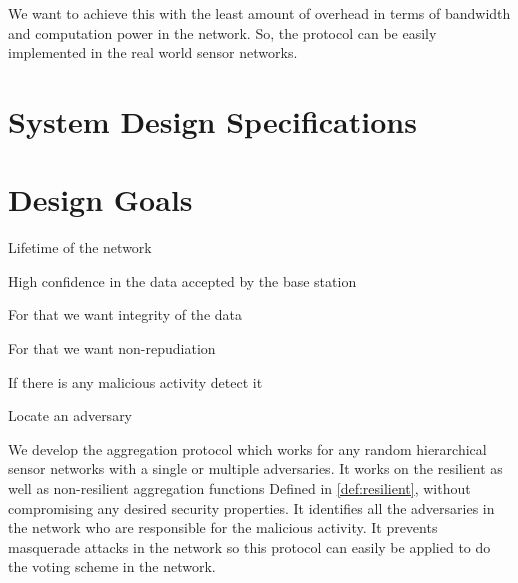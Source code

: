 	We want to achieve this with the least amount of overhead in terms of bandwidth and computation power in the network.
	So, the protocol can be easily implemented in the real world sensor networks.
	

\section{System Design Specifications}

\section{Design Goals}
	Lifetime of the network

	High confidence in the data accepted by the base station

	For that we want integrity of the data

	For that we want non-repudiation

	If there is any malicious activity detect it

	Locate an adversary


	We develop the aggregation protocol which works for any random hierarchical sensor networks with a single or multiple adversaries.
	It works on the resilient as well as non-resilient aggregation functions Defined in \ref{def:resilient}, without compromising any desired security properties.
	It identifies all the adversaries in the network who are responsible for the malicious activity.
	It prevents masquerade attacks in the network so this protocol can easily be applied to do the voting scheme in the network.

